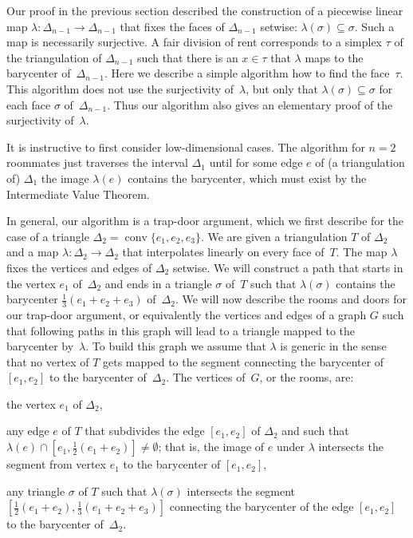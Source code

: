 \documentclass[a4paper,10pt,reqno, english]{amsart}
\theoremstyle{plain}
\theoremstyle{definition}
\DeclareMathOperator{\conv}{conv}
\begin{document}
Our proof in the previous section described the construction of a piecewise linear map $\lambda\colon \Delta_{n-1} \longrightarrow \Delta_{n-1}$
that fixes the faces of $\Delta_{n-1}$ setwise: $\lambda(\sigma) \subseteq \sigma$. Such a map is necessarily surjective. A fair division of rent corresponds to a 
simplex $\tau$ of the triangulation of $\Delta_{n-1}$ such that there is an $x \in \tau$ that $\lambda$ maps to the barycenter of~$\Delta_{n-1}$. 
Here we describe a simple algorithm how to find the face~$\tau$. This algorithm does not use the surjectivity of~$\lambda$, but only that
$\lambda(\sigma) \subseteq \sigma$ for each face $\sigma$ of~$\Delta_{n-1}$. Thus our algorithm also gives an elementary proof of the 
surjectivity of~$\lambda$.


It is instructive to first consider low-dimensional cases. The algorithm for $n=2$ roommates just traverses the interval
$\Delta_1$ until for some edge $e$ of (a triangulation of) $\Delta_1$ the image $\lambda(e)$ contains the barycenter,
which must exist by the Intermediate Value Theorem.

In general, our algorithm is a trap-door argument, which we first describe for the case of a triangle $\Delta_2 = \conv\{e_1,e_2,e_3\}$.
We are given a triangulation $T$ of $\Delta_2$ and a map $\lambda \colon \Delta_2 \longrightarrow \Delta_2$ that interpolates 
linearly on every face of~$T$. The map $\lambda$ fixes the vertices and edges of $\Delta_2$ setwise. 
We will construct a path that starts in the vertex $e_1$ of~$\Delta_2$ and ends in a triangle 
$\sigma$ of~$T$ such that $\lambda(\sigma)$ contains the barycenter $\frac13(e_1+e_2+e_3)$ of~$\Delta_2$. We will now
describe the rooms and doors for our trap-door argument, or equivalently the vertices and edges of a graph $G$ such that 
following paths in this graph will lead to a triangle mapped to the barycenter by~$\lambda$. To build this graph we assume that 
$\lambda$ is generic in the sense that no vertex of $T$ gets mapped to the segment connecting the barycenter of $[e_1,e_2]$ to 
the barycenter of~$\Delta_2$.
The vertices of~$G$, or the rooms, are: 
\begin{compactitem}
	\item the vertex $e_1$ of $\Delta_2$,
	\item any edge $e$ of $T$ that subdivides the edge $[e_1,e_2]$ of $\Delta_2$ and such that $\lambda(e) \cap [e_1, \frac12(e_1+e_2)] \ne \emptyset$;
	that is, the image of $e$ under $\lambda$ intersects the segment from vertex $e_1$ to the barycenter of $[e_1,e_2]$,
	\item any triangle $\sigma$ of $T$ such that $\lambda(\sigma)$ intersects the segment $[\frac12(e_1+e_2), \frac13(e_1+e_2+e_3)]$
	connecting the barycenter of the edge $[e_1,e_2]$ to the barycenter of~$\Delta_2$. 
\end{compactitem}
\end{document}
